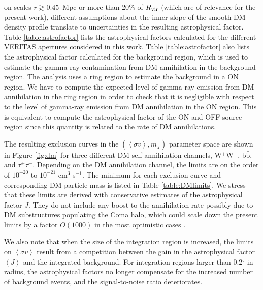 \documentclass[12pt,manuscript]{aastex}
\newcommand{\expval}[1]{\left\langle #1 \right\rangle}
\begin{document}
on scales $r\gtrsim 0.45$~Mpc or more than 20\% of $R_{\rm vir}$ (which are of relevance for the present work), different assumptions
about the inner slope of the smooth DM density profile translate to 
uncertainties in the
resulting astrophysical factor. Table \ref{table:astrofactor} lists the
astrophysical factors calculated for the different VERITAS apertures considered in this work.  Table
\ref{table:astrofactor} also lists the astrophysical factor calculated for the background region,
which is used to estimate the gamma-ray contamination from DM annihilation in the background region. The analysis uses a ring region to estimate the background in a ON region. We have to compute the expected level of gamma-ray emission from DM annihilation in the ring region in order to check that it is negligible with respect to the level of gamma-ray emission from DM annihilation in the ON region. This is equivalent to compute the astrophysical factor of the ON and OFF source region since this quantity is related to the rate of DM annihilations.

The resulting exclusion curves in the $(\expval{\sigma v}, m_{\chi})$ parameter space are shown in
Figure \ref{fig:dm} for three different DM self-annihilation channels, W$^{+}$W$^{-}$,
b$\bar{\mathrm{b}}$, and $\tau^{+}\tau^{-}$. Depending on the
DM annihilation channel, the limits are on the order of
$10^{-20}$ to $10^{-21}$ cm$^{3}$ s$^{-1}$. The
minimum for each exclusion curve and corresponding DM particle mass is listed in Table
\ref{table:DMlimits}. We stress that these limits are derived with conservative estimates of the
astrophysical factor $J$. They do not include any boost to the annihilation rate possibly due to DM
substructures populating the Coma halo, which could scale down the present limits by a factor
$O(1000)$ in the most optimistic cases
\citep{article:PinzkePfrommerBergstrom,article:Gao_etal:2012}.

We also note that when the size of the integration region is increased, the limits on
$\expval{\sigma v}$ result from a competition between the gain in the astrophysical factor
$\expval{J}$ and the integrated background. For integration regions larger than 0.2$^{\circ}$ in
radius, the astrophysical factors no longer compensate for the increased number of background
events, and the signal-to-noise ratio deteriorates.
\end{document}
